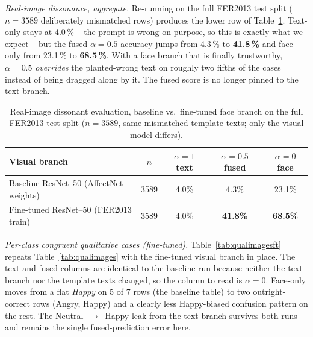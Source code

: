 \documentclass[sigconf,nonacm]{acmart}
\begin{document}
  \emph{Real-image dissonance, aggregate.} Re-running   on the full FER2013 test split ($n\!=\!3589$ deliberately mismatched rows) produces the lower row of Table~\ref{tab:dissonanceft}. Text-only stays at 4.0\,\% -- the prompt is wrong on purpose, so this is exactly what we expect -- but the fused $\alpha\!=\!0.5$ accuracy jumps from 4.3\,\% to \textbf{41.8\,\%} and face-only from 23.1\,\% to \textbf{68.5\,\%}. With a face branch that is finally trustworthy, $\alpha\!=\!0.5$ \emph{overrides} the planted-wrong text on roughly two fifths of the cases instead of being dragged along by it. The fused score is no longer pinned to the text branch.

  \begin{table}[t]
    \centering
    \small
    \caption{Real-image dissonant evaluation, baseline vs.\ fine-tuned face branch on the full FER2013 test split ($n\!=\!3589$, same mismatched template texts; only the visual model differs).}
    \label{tab:dissonanceft}
    \begin{tabular}{@{}lcccc@{}}
      \toprule
      \textbf{Visual branch} & \textbf{$n$} & \textbf{$\alpha=1$ text} & \textbf{$\alpha=0.5$ fused} & \textbf{$\alpha=0$ face} \\
      \midrule
      Baseline ResNet--50 (AffectNet weights) & 3589 & 4.0\% & 4.3\%  & 23.1\% \\
      Fine-tuned ResNet--50 (FER2013 train)   & 3589 & 4.0\% & \textbf{41.8\%} & \textbf{68.5\%} \\
      \bottomrule
    \end{tabular}
  \end{table}

  \emph{Per-class congruent qualitative cases (fine-tuned).} Table~\ref{tab:qualimagesft} repeats Table~\ref{tab:qualimages} with the fine-tuned visual branch in place. The text and fused columns are identical to the baseline run because neither the text branch nor the template texts changed, so the column to read is $\alpha\!=\!0$. Face-only moves from a flat \emph{Happy} on 5 of 7 rows (the baseline table) to two outright-correct rows (Angry, Happy) and a clearly less Happy-biased confusion pattern on the rest. The Neutral~$\to$~Happy leak from the text branch survives both runs and remains the single fused-prediction error here.
\end{document}
